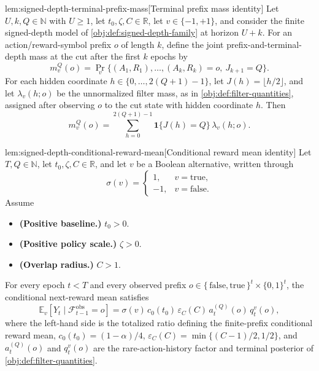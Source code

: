 \begin{lemmav}{lem:signed-depth-terminal-prefix-mass}[Terminal prefix mass identity]
Let \(U,k,Q\in\mathbb N\) with \(U\ge 1\), let \(t_0,\zeta,C\in\mathbb R\), let \(v\in\{-1,+1\}\), and consider the finite signed-depth model of \cref{obj:def:signed-depth-family} at horizon \(U+k\).  For an action/reward-symbol prefix \(o\) of length \(k\), define the joint prefix-and-terminal-depth mass at the cut after the first \(k\) epochs by
\[
m_v^Q(o)
=
\Pr_v\{(A_1,R_1),\ldots,(A_k,R_k)=o,\ J_{k+1}=Q\}.
\]
For each hidden coordinate \(h\in\{0,\ldots,2(Q+1)-1\}\), let \(J(h)=\lfloor h/2\rfloor\), and let \(\lambda_v(h;o)\) be the unnormalized filter mass, as in \cref{obj:def:filter-quantities}, assigned after observing \(o\) to the cut state with hidden coordinate \(h\).  Then
\[
m_v^Q(o)
=
\sum_{h=0}^{2(Q+1)-1}
\mathbf 1\{J(h)=Q\}\,\lambda_v(h;o).
\]
\end{lemmav}

\begin{lemmav}{lem:signed-depth-conditional-reward-mean}[Conditional reward mean identity]
Let \(T,Q\in\mathbb N\), let \(t_0,\zeta,C\in\mathbb R\), and let \(v\) be a Boolean alternative, written through
\[
\sigma(v)=
\begin{cases}
1, & v=\mathrm{true},\\
-1, & v=\mathrm{false}.
\end{cases}
\]
Assume
\begin{itemize}
\item \textbf{(Positive baseline.)} \(t_0>0\).
\item \textbf{(Positive policy scale.)} \(\zeta>0\).
\item \textbf{(Overlap radius.)} \(C>1\).
\end{itemize}
For every epoch \(t<T\) and every observed prefix \(o\in\{\,\mathrm{false},\mathrm{true}\,\}^{t}\times\{0,1\}^{t}\), the conditional next-reward mean satisfies
\[
\mathbb E_v[Y_t\mid \mathcal F_{t-1}^{\mathrm{obs}}=o]
=
\sigma(v)\,c_0(t_0)\,\varepsilon_C(C)\,
a_t^{(Q)}(o)\,q_t^v(o),
\]
where the left-hand side is the totalized ratio defining the finite-prefix conditional reward mean, \(c_0(t_0)=(1-\alpha)/4\), \(\varepsilon_C(C)=\min\{(C-1)/2,1/2\}\), and \(a_t^{(Q)}(o)\) and \(q_t^v(o)\) are the rare-action-history factor and terminal posterior of \cref{obj:def:filter-quantities}.
\end{lemmav}


